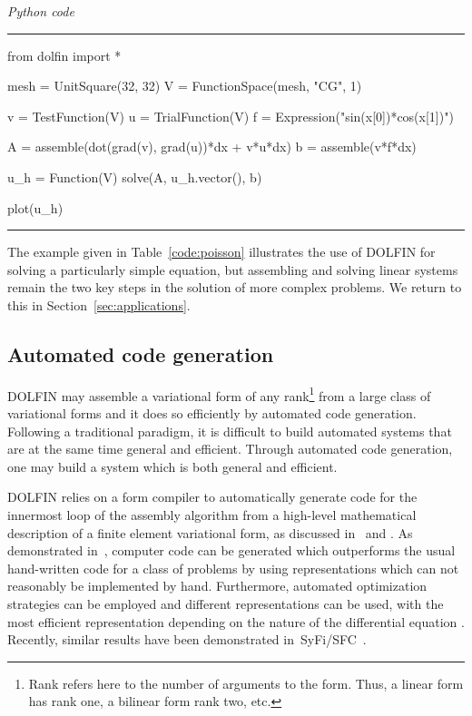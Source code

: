 \documentclass[acmtoms]{acmtrans2m}
\newenvironment{pythoncode}[1]{\center\minipage{#1\textwidth}\footnotesize\hfill\it Python code \rm\vspace{0.1cm}\hrule\renewcommand{\baselinestretch}{0.9}\footnotesize\verbatim}{\endverbatim\hrule\normalsize\endminipage\newline\endcenter}
\newcommand{\dolfin}{DOLFIN}
\begin{document}
\begin{table}
\begin{pythoncode}{0.9}
from dolfin import *

mesh = UnitSquare(32, 32)
V = FunctionSpace(mesh, "CG", 1)

v = TestFunction(V)
u = TrialFunction(V)
f = Expression("sin(x[0])*cos(x[1])")

A = assemble(dot(grad(v), grad(u))*dx + v*u*dx)
b = assemble(v*f*dx)

u_h = Function(V)
solve(A, u_h.vector(), b)

plot(u_h)
\end{pythoncode}
\caption{A complete program for solving the reaction--diffusion
  problem~\eqref{eq:reactiondiffusion} and plotting the solution. This
  and other presented code examples are written for \dolfin{} version
  0.9.5 (released in December 2009).}
\label{code:poisson}
\end{table}

The example given in Table~\ref{code:poisson} illustrates the use of
\dolfin{} for solving a particularly simple equation, but assembling and
solving linear systems remain the two key steps in the solution of
more complex problems. We return to this in
Section~\ref{sec:applications}.

\subsection{Automated code generation}

\dolfin{} may assemble a variational form of any rank\footnote{Rank
  refers here to the number of arguments to the form. Thus, a linear
  form has rank one, a bilinear form rank two, etc.} from a large
class of variational forms and it does so efficiently by automated
code generation. Following a traditional paradigm, it is difficult to
build automated systems that are at the same time general and
efficient. Through automated code generation, one may
build a system which is both general and efficient.

\dolfin{} relies on a form compiler to automatically generate
code for the innermost loop of the assembly algorithm from a
high-level mathematical description of a finite element variational
form, as discussed in~ and .
As demonstrated in~, computer code can be generated
which outperforms the usual hand-written code for a class of problems
by using representations which can not reasonably be implemented by
hand. Furthermore, automated optimization strategies can be employed
\cite{kirby:2005,kirby:2006b,logg:article:11,oelgaard:2009} and
different representations can be used, with the most efficient
representation depending on the nature of the
differential equation \cite{oelgaard:2009}. Recently, similar results
have been demonstrated in~SyFi/SFC~\cite{alnaes:2009}.
\end{document}
